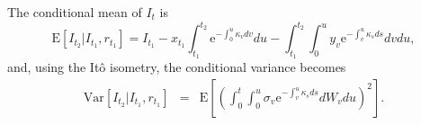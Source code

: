 \documentclass{report}
\newcommand{\E}{\mathrm{E}}
\newcommand{\Var}{\mathrm{Var}}
\newcommand{\e}{\text{e}}
\begin{document}
The conditional mean of $I_t$ is
\begin{equation}
\E \left[ I_{t_{2}} | I_{t_1}, r_{t_1} \right] = I_{t_1} - x_{t_1} \int_{t_1}^{t_2} \e^{-\int_{0}^{u} \kappa_v dv} du - \int_{t_1}^{t_2} \int_{0}^{u} y_v \e^{-\int_v^{u} \kappa_s ds} dv du,
\end{equation}
and, using the It\^{o} isometry, the conditional variance becomes
\begin{eqnarray}
\Var \left[ I_{t_{2}} | I_{t_1}, r_{t_1} \right] &=& \E \left[ \left( \int_0^t \int_{0}^{u} \sigma_v \e^{-\int_v^{u} \kappa_s ds} dW_v du \right)^2 \right].
\end{eqnarray}


 
\end{document}
